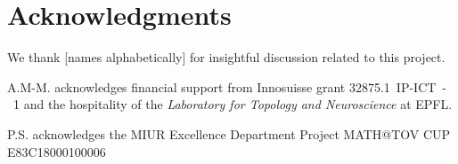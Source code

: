 
\section*{Acknowledgments}

We thank [names alphabetically] for insightful discussion related to this project.

A.M-M. acknowledges financial support from Innosuisse grant 32875.1~IP-ICT~-~1 and the hospitality of the \textit{Laboratory for Topology and Neuroscience} at EPFL.

P.S. acknowledges the MIUR Excellence Department Project MATH@TOV CUP E83C18000100006

